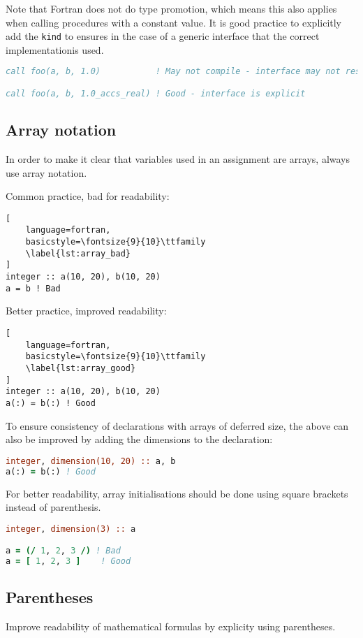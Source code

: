 \documentclass[11pt]{report}
\begin{document}
Note that Fortran does not do type promotion, which means this also applies when calling procedures with a
constant value. It is good practice to explicitly add the \texttt{kind} to ensures in the case of a generic 
interface that the correct implementationis used.
\begin{lstlisting}[language=fortran, basicstyle=\fontsize{9}{10}\ttfamily]
call foo(a, b, 1.0)           ! May not compile - interface may not resolve

call foo(a, b, 1.0_accs_real) ! Good - interface is explicit
\end{lstlisting}

\subsection{Array notation}
In order to make it clear that variables used in an assignment are arrays, always use array notation.

Common practice, bad for readability:
\begin{lstlisting}[
	language=fortran,
    basicstyle=\fontsize{9}{10}\ttfamily
    \label{lst:array_bad}
]
integer :: a(10, 20), b(10, 20)
a = b ! Bad
\end{lstlisting}

Better practice, improved readability:
\begin{lstlisting}[
	language=fortran,
    basicstyle=\fontsize{9}{10}\ttfamily
    \label{lst:array_good}
]
integer :: a(10, 20), b(10, 20)
a(:) = b(:) ! Good
\end{lstlisting}

To ensure consistency of declarations with arrays of deferred size, the above can also be improved
by adding the dimensions to the declaration:
\begin{lstlisting}[language=fortran,basicstyle=\fontsize{9}{10}\ttfamily\label{lst:array_good_decl}
]
integer, dimension(10, 20) :: a, b
a(:) = b(:) ! Good
\end{lstlisting}

For better readability, array initialisations should be done using square brackets instead of parenthesis.
\begin{lstlisting}[language=fortran,basicstyle=\fontsize{9}{10}\ttfamily\label{lst:array_good_decl}
]
integer, dimension(3) :: a

a = (/ 1, 2, 3 /) ! Bad
a = [ 1, 2, 3 ]    ! Good
\end{lstlisting}


\subsection{Parentheses}
Improve readability of mathematical formulas by explicity using parentheses.
\end{document}
